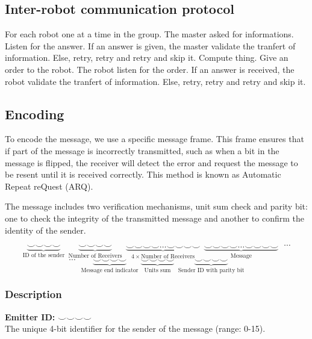 \documentclass[../main.tex]{subfiles}
\begin{document}
\subsection{Inter-robot communication protocol}
For each robot one at a time in the group.
The master asked for informations.
Listen for the answer.
If an answer is given, the master validate the tranfert of information.
Else, retry, retry and retry and skip it.
Compute thing.
Give an order to the robot.
The robot listen for the order.
If an answer is received, the robot validate the tranfert of information.
Else, retry, retry and retry and skip it.

\subsection{Encoding}

To encode the message, we use a specific message frame. This frame ensures that if part of the message is incorrectly transmitted, such as when a bit in the message is flipped, the receiver will detect the error and request the message to be resent until it is received correctly. This method is known as Automatic Repeat reQuest (ARQ).

The message includes two verification mechanisms, unit sum check and parity bit: one to check the integrity of the transmitted message and another to confirm the identity of the sender.

$$
\underbrace{\smallsmile \smallsmile \smallsmile \smallsmile}_{\text{ID of the sender}}~~
\underbrace{\smallsmile \smallsmile \smallsmile \smallsmile}_{\text{Number of Receivers}}~~
\underbrace{\smallsmile \smallsmile \smallsmile \smallsmile \dots \smallsmile \smallsmile \smallsmile \smallsmile}_{4 \times \text{Number of Receivers}}~~
\underbrace{\smallsmile \smallsmile \smallsmile \smallsmile \dots \smallsmile \smallsmile \smallsmile \smallsmile}_{\text{Message}}
~~~ \cdots
$$
$$
\cdots ~~~
\underbrace{\smallsmile \smallsmile \smallsmile \smallsmile}_{\text{Message end indicator}}\;
\underbrace{\smallsmile \smallsmile \smallsmile \smallsmile}_{\text{Units sum}}~~
\underbrace{\smallsmile \smallsmile \smallsmile \smallsmile}_{\text{Sender ID with parity bit}}
$$

\subsubsection{Description}

\textbf{Emitter ID:} $\smallsmile \smallsmile \smallsmile \smallsmile$\\
The unique 4-bit identifier for the sender of the message (range: 0-15).\\
\end{document}
